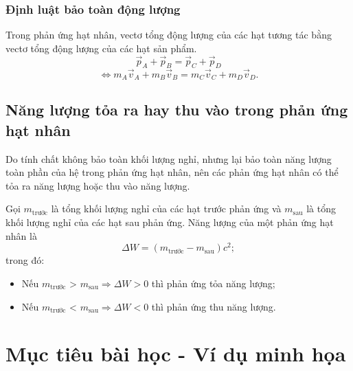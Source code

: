 \subsubsection{Định luật bảo toàn động lượng}
Trong phản ứng hạt nhân, vectơ tổng động lượng của các hạt tương tác bằng vectơ tổng động lượng của các hạt sản phẩm.
\begin{equation}
	\vec{p}_A + \vec{p}_B = \vec{p}_C + \vec{p}_D
\end{equation}
\begin{equation}
	\Leftrightarrow m_A\vec{v}_A + m_B\vec{v}_B = m_C\vec{v}_C + m_D\vec{v}_D.
\end{equation}

\subsection{Năng lượng tỏa ra hay thu vào trong phản ứng hạt nhân}
Do tính chất không bảo toàn khối lượng nghỉ, nhưng lại bảo toàn năng lượng toàn phần của hệ trong phản ứng hạt nhân, nên các phản ứng hạt nhân có thể tỏa ra năng lượng hoặc thu vào năng lượng. 

Gọi $m_\text{trước}$ là tổng khối lượng nghỉ của các hạt trước phản ứng và $m_\text{sau}$ là tổng khối lượng nghỉ của các hạt sau phản ứng. Năng lượng của một phản ứng hạt nhân là
\begin{equation}
	\Delta W = \left(m_\text{trước} - m_\text{sau}\right) c^2;
\end{equation}
trong đó:
\begin{itemize}
	\item Nếu $m_\text{trước}$ > $m_\text{sau} \Rightarrow \Delta W >0$ thì phản ứng tỏa năng lượng;
	\item Nếu $m_\text{trước}$ < $m_\text{sau} \Rightarrow \Delta W < 0$ thì phản ứng thu năng lượng.
\end{itemize}


\section{Mục tiêu bài học - Ví dụ minh họa}

